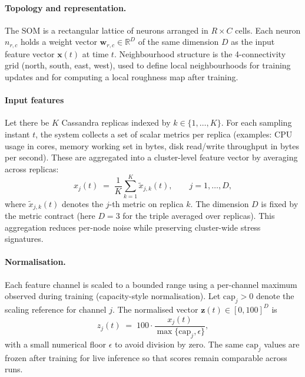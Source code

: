 \documentclass[sigconf]{acmart}
\begin{document}
\paragraph{Topology and representation.}
The SOM is a rectangular lattice of neurons arranged in $R \times C$ cells. Each neuron $n_{r,c}$ holds a weight vector $\mathbf{w}_{r,c} \in \mathbb{R}^D$ of the same dimension $D$ as the input feature vector $\mathbf{x}(t)$ at time $t$. Neighbourhood structure is the 4-connectivity grid (north, south, east, west), used to define local neighbourhoods for training updates and for computing a local roughness map after training.

\paragraph{Input features}
Let there be $K$ Cassandra replicas indexed by $k \in \{1,\ldots,K\}$. For each sampling instant $t$, the system collects a set of scalar metrics per replica (examples: CPU usage in cores, memory working set in bytes, disk read/write throughput in bytes per second). These are aggregated into a cluster-level feature vector by averaging across replicas:
\begin{equation}
  x_j(t) \;=\; \frac{1}{K}\sum_{k=1}^{K} \tilde{x}_{j,k}(t),
  \qquad j=1,\ldots,D,
\end{equation}
where $\tilde{x}_{j,k}(t)$ denotes the $j$-th metric on replica $k$. The dimension $D$ is fixed by the metric contract (here $D{=}3$ for the triple averaged over replicas). This aggregation reduces per-node noise while preserving cluster-wide stress signatures.

\paragraph{Normalisation.}
Each feature channel is scaled to a bounded range using a per-channel maximum observed during training (capacity-style normalisation). Let $\mathrm{cap}_j > 0$ denote the scaling reference for channel $j$. The normalised vector $\mathbf{z}(t) \in [0,100]^D$ is
\begin{equation}
  z_j(t) \;=\; 100 \cdot \frac{x_j(t)}{\max\{\mathrm{cap}_j,\epsilon\}},
\end{equation}
with a small numerical floor $\epsilon$ to avoid division by zero. The same $\mathrm{cap}_j$ values are frozen after training for live inference so that scores remain comparable across runs.
\end{document}
